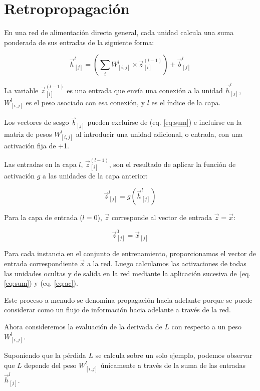 \section{Retropropagación}

En una red de alimentación directa general, cada unidad calcula una suma ponderada de sus entradas de la siguiente forma:

\begin{equation}
\vec{h}_{[j]}^l = \left(\sum_{i}  W_{[i,j]}^l \times \vec{z}_{[i]}^{(l-1)}\right) + \vec{b}_{[j]}^l
\label{eq:sum}
\end{equation}

La variable $\vec{z}_{[i]}^{(l-1)}$ es una entrada que envía una conexión a la unidad $\vec{h}_{[j]}^l$, $W_{[i,j]}^l$ es el peso asociado con esa conexión, y $l$ es el índice de la capa.

Los vectores de sesgo $\vec{b}_{[j]}$ pueden excluirse de (eq. \ref{eq:sum}) e incluirse en la matriz de pesos $W_{[i,j]}^l$ al introducir una unidad adicional, o entrada, con una activación fija de +1.

Las entradas en la capa $l$, $\vec{z}_{[i]}^{(l-1)}$, son el resultado de aplicar la función de activación $g$ a las unidades de la capa anterior:

\begin{equation}
\vec{z}_{[j]}^{l} = g(\vec{h}_{[j]}^{l})
\label{eq:ac}
\end{equation}

Para la capa de entrada ($l=0$), $\vec{z}$ corresponde al vector de entrada $\vec{z} = \vec{x}$:

\begin{equation}
\vec{z}_{[j]}^0 = \vec{x}_{[j]}
\end{equation}

Para cada instancia en el conjunto de entrenamiento, proporcionamos el vector de entrada correspondiente $\vec{x}$ a la red. Luego calculamos las activaciones de todas las unidades ocultas y de salida en la red mediante la aplicación sucesiva de (eq. \ref{eq:sum}) y (eq. \ref{eq:ac}).

Este proceso a menudo se denomina propagación hacia adelante porque se puede considerar como un flujo de información hacia adelante a través de la red.

Ahora consideremos la evaluación de la derivada de $L$ con respecto a un peso $W_{[i,j]}^l$.

Suponiendo que la pérdida $L$ se calcula sobre un solo ejemplo, podemos observar que $L$ depende del peso $W_{[i,j]}^l$ únicamente a través de la suma de las entradas $\vec{h}_{[j]}^{l}$.

